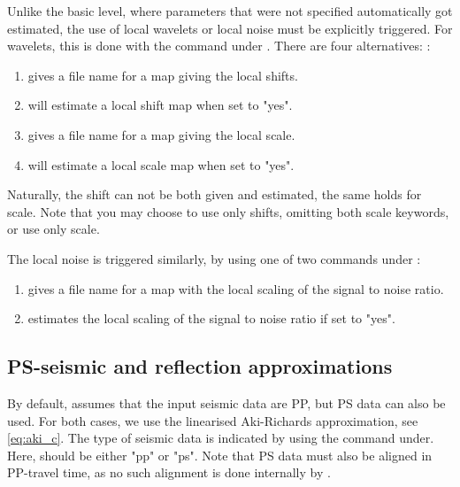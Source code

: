 Unlike the basic level, where parameters that were not specified 
automatically got estimated, the use of local wavelets or local noise
must be explicitly triggered. For wavelets, this is done with the
 command under
. There are four alternatives:
: 
\begin{enumerate}
\item {} gives a file name for a map giving the local shifts. 
\item {} will estimate a local shift map when set to "yes".
\item {} gives a file name for a map giving the local scale. 
\item {} will estimate a local scale map when set to "yes".
\end{enumerate}
Naturally, the shift can not be both given and estimated, the same
holds for scale. Note that you may choose to use only shifts, omitting
both scale keywords, or use only scale. 

The local noise is triggered similarly, by using one of two
commands under : 
\begin{enumerate}
\item {} gives a file name for a map with the local scaling of
  the signal to noise ratio.
\item {} estimates the local scaling of the
  signal to noise ratio if set to "yes". 
\end{enumerate}

\subsection{PS-seismic and reflection approximations}
By default, \crava assumes that the input seismic data are PP, but PS
data can also be used. For both cases, we use the linearised
Aki-Richards approximation, see \autoref{eq:aki_c}. The type of seismic data is
indicated by using the  command
under. Here,  should be either "pp" or
"ps". Note that PS data must also be aligned in PP-travel time, as no
such alignment is done internally by \crava. 

